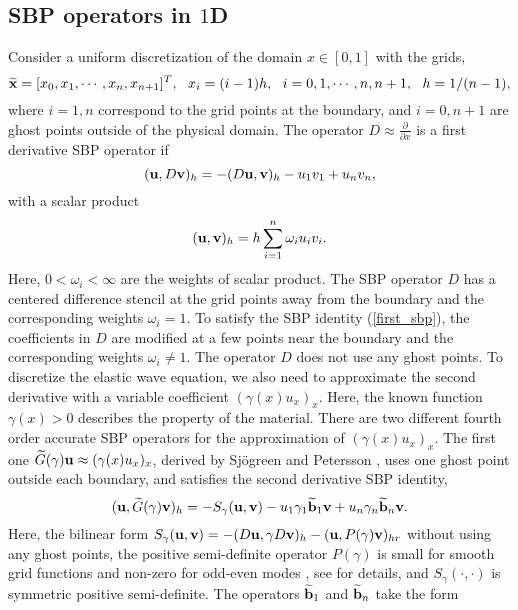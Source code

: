\subsection{SBP operators in $1$D}\label{sec_sbp_1d}
Consider a uniform discretization of the domain $x\in[0,1]$ with the grids,
\[\widetilde
	{\bf x} = [x_0,x_1,\cdots,x_n,x_{n+1}]^T,\ \  x_i = (i-1)h,\ \ i = 0,1,\cdots,n,n+1,\ \ h = 1/(n-1),\]
where $i = 1,n$ correspond to the grid points at the boundary, and $i = 0,n+1$ are ghost points outside of the physical domain. The  operator $D \approx \frac{\partial }{\partial x}$ is a first derivative SBP operator \cite{Kreiss1974,Strand1994} if 
\begin{equation}\label{first_sbp}
({\bf u}, D{\bf v})_h = -(D{\bf u},{\bf v})_h - u_1v_1 + u_nv_n,
\end{equation}
with a scalar product
\begin{equation}\label{inner_product}
({\bf u},{\bf v})_h = h\sum_{i = 1}^{n}\omega_iu_iv_i.
\end{equation}
Here, $0<\omega_i < \infty $ are the weights of scalar product. The SBP operator $D$ has a centered difference stencil at the grid points away from the boundary and the corresponding weights $\omega_i = 1$. To satisfy the SBP identity (\ref{first_sbp}), the coefficients in $D$ are  modified at a few points near the boundary and the corresponding weights $\omega_i \neq 1$. The operator $D$ does not use any ghost points. To discretize the elastic wave equation, we also need to approximate the second derivative with a variable coefficient $(\gamma(x)u_x)_x$. Here, the known function $\gamma(x)>0$ describes the property of the material. There are two different fourth order accurate SBP operators for the approximation of $(\gamma(x)u_x)_x$. The first one $\widetilde{G}(\gamma){\bf u} \approx (\gamma(x)u_x)_x $, derived by Sj\"ogreen and Petersson \cite{sjogreen2012fourth}, uses one ghost point outside each boundary, and satisfies the second derivative SBP identity,
\begin{equation}\label{sbp_2nd_1}
({\bf u}, \wt{G}(\gamma){\bf v})_h = -S_\gamma({\bf u},{\bf v})-u_1\gamma_1\wt{\bf b}_1{\bf v} + u_n\gamma_n\wt{\bf b}_n {\bf v}.
\end{equation}
Here, the bilinear form $S_\gamma({\bf u},{\bf v}) = -(D{\bf u},\gamma D{\bf v})_h - ({\bf u}, P(\gamma){\bf v})_{hr}$ without using any ghost points, the positive semi-definite operator $P(\gamma)$ is small for smooth grid functions and non-zero for odd-even modes , see \cite{petersson2015wave,sjogreen2012fourth} for details, and $S_\gamma(\cdot,\cdot)$ is symmetric positive semi-definite. The operators $\widetilde{\bf b}_1$ and $\widetilde{\bf b}_n$ take the form %
